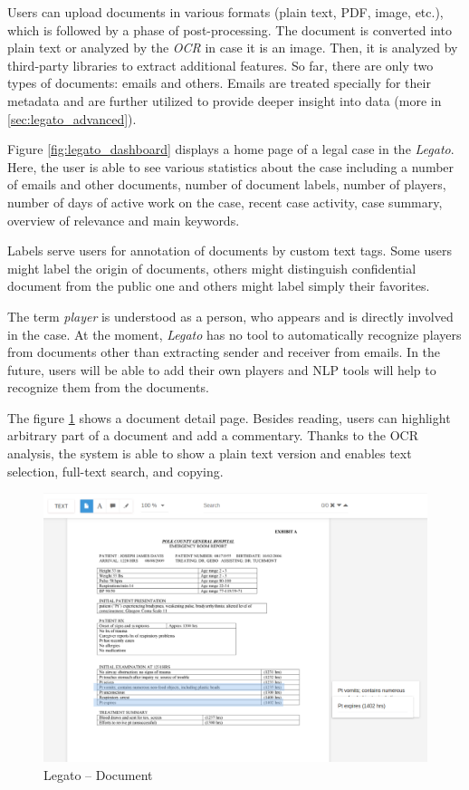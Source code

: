 \documentclass[
  digital, %
  notable,   %
  nolof,     %
  nolot,     %
  draft
]{fithesis3}
\begin{document}
Users can upload documents in various formats (plain text, PDF, image, etc.), which is followed by a phase of post-processing.
The document is converted into plain text or analyzed by the \textit{OCR} in case it is an image.
Then, it is analyzed by third-party libraries to extract additional features.
So far, there are only two types of documents: emails and others.
Emails are treated specially for their metadata and are further utilized to provide deeper insight into data (more in \ref{sec:legato_advanced}).

Figure \ref{fig:legato_dashboard} displays a home page of a legal case in the \textit{Legato}.
Here, the user is able to see various statistics about the case including a number of emails and other documents, number of document labels, number of players, number of days of active work on the case, recent case activity, case summary, overview of relevance and main keywords.

Labels serve users for annotation of documents by custom text tags.
Some users might label the origin of documents, others might distinguish confidential document from the public one and others might label simply their favorites.

The term \textit{player} is understood as a person, who appears and is directly involved in the case.
At the moment, \textit{Legato} has no tool to automatically recognize players from documents other than extracting sender and receiver from emails.
In the future, users will be able to add their own players and NLP tools will help to recognize them from the documents.

The figure \ref{fig:legato_document} shows a document detail page.
Besides reading, users can highlight arbitrary part of a document and add a commentary.
Thanks to the OCR analysis, the system is able to show a plain text version and enables text selection, full-text search, and copying.


\begin{figure}[h]
\caption{Legato -- Document}
\label{fig:legato_document}
\includegraphics[width=\textwidth]{img/Legato-File}
\end{figure}
\end{document}
